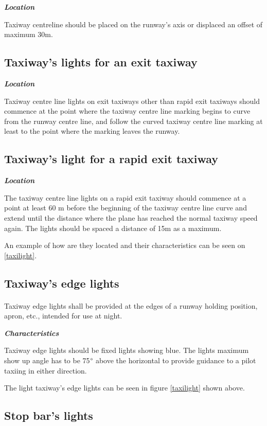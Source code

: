 		\textbf{\textit{Location}}
		
		Taxiway centreline should be placed on the runway's axis or displaced an offset of maximum 30m.
		
		\subsection{Taxiway's lights for an exit taxiway}
		\textbf{\textit{Location}}
		
		Taxiway centre line lights on exit taxiways other than rapid exit taxiways should commence at the point where the taxiway centre line marking begins to curve from the runway centre line, and follow the curved taxiway centre line marking at least to the point where the marking leaves the runway.
		
		\subsection{Taxiway's light for a rapid exit taxiway}
		\textbf{\textit{Location}}
		
		The taxiway centre line lights on a rapid exit taxiway should commence at a point at least 60 m before the beginning of the taxiway centre line curve and extend until the distance where the plane has reached the normal taxiway speed again. The lights should be spaced a distance of 15m as a maximum.
		
		An example of how are they located and their characteristics can be seen on \ref{taxilight}.
		
		\subsection{Taxiway's edge lights}
		\paragraph{}Taxiway edge lights shall be provided at the edges of a runway holding position, apron, etc., intended for use at night.
		
		\textbf{\textit{Characteristics}}
		
		Taxiway edge lights should be fixed lights showing blue. The lights maximum show up angle has to be 75\(\degree\) above the horizontal to provide guidance to a pilot taxiing in either direction. 
		
		The light taxiway's edge lights can be seen in figure \ref{taxilight} shown above.
		
		\subsection{Stop bar's lights}
